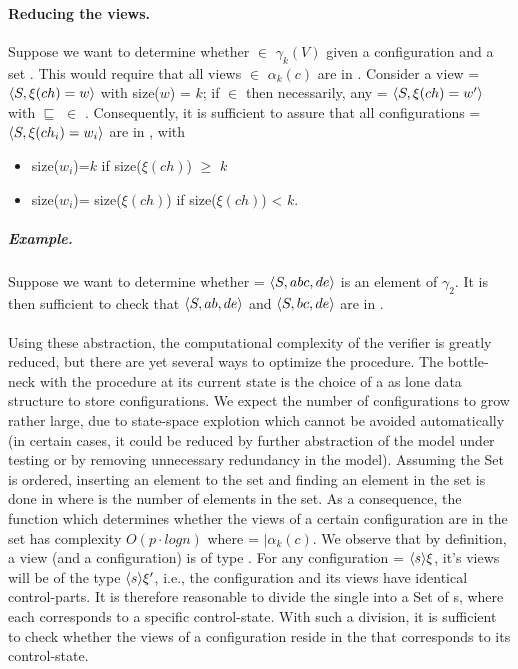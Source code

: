\paragraph{Reducing the views.}
Suppose we want to determine whether  $\in$ $\gamma_k(V)$ given a configuration  and a set . This would require that all views  $\in$ $\alpha_k(c)$ are in . Consider a view  = $\langle S, \xi(ch)=w\rangle$ with size($w$) = $k$; if  $\in$  then necessarily, any  = $\langle S, \xi(ch)=w'\rangle$ with  $\sqsubseteq$  $\in$ . Consequently, it is sufficient to assure that all configurations  = $\langle S,\xi(ch_i)=w_i\rangle$ are in , with

\begin{itemize}
\item
size($w_i$)=$k$ if size($\xi(ch)$) $\geq$ $k$
\item
size($w_i$)= size($\xi(ch)$) if size($\xi(ch)$) < $k$.
\end{itemize}

\subparagraph{Example.} Suppose we want to determine whether  = $\langle S, abc, de\rangle$ is an element of $\gamma_2$. It is then sufficient to check that $\langle S,ab,de\rangle$ and $\langle S,bc ,de\rangle$ are in .
\\\\

Using these abstraction, the computational complexity of the verifier is greatly reduced, but there are yet several ways to optimize the procedure. The bottle-neck with the procedure at its current state is the choice of a  as lone data structure to store configurations. We expect the number of configurations to grow rather large, due to state-space explotion which cannot be avoided automatically (in certain cases, it could be reduced by further abstraction of the model under testing or by removing unnecessary redundancy in the model). Assuming the Set is ordered, inserting an element to the set and finding an element in the set is done in  where  is the number of elements in the set. As a consequence, the function  which determines whether the views of a certain configuration are in the set has complexity $O(p \cdot log n)$ where  = $|\alpha_k(c)$. We observe that by definition, a view (and a configuration) is of type . For any configuration  = $\langle s\rangle{\xi}$, it's views will be of the type $\langle s\rangle{\xi'}$, i.e., the configuration and its views have identical control-parts. It is therefore reasonable to divide the single  into a Set of s, where each  corresponds to a specific control-state. With such a division, it is sufficient to check whether the views of a configuration reside in the  that corresponds to its control-state.

